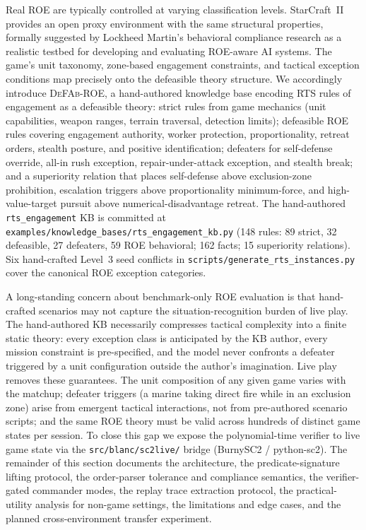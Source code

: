 \documentclass{article}
\theoremstyle{definition}
\begin{document}
Real ROE are typically controlled at varying classification levels. StarCraft~II provides an open proxy environment with the same structural properties, formally suggested by Lockheed Martin's behavioral compliance research as a realistic testbed for developing and evaluating ROE-aware AI systems. The game's unit taxonomy, zone-based engagement constraints, and tactical exception conditions map precisely onto the defeasible theory structure. We accordingly introduce \textsc{DeFAb-ROE}, a hand-authored knowledge base encoding RTS rules of engagement as a defeasible theory: strict rules from game mechanics (unit capabilities, weapon ranges, terrain traversal, detection limits); defeasible ROE rules covering engagement authority, worker protection, proportionality, retreat orders, stealth posture, and positive identification; defeaters for self-defense override, all-in rush exception, repair-under-attack exception, and stealth break; and a superiority relation that places self-defense above exclusion-zone prohibition, escalation triggers above proportionality minimum-force, and high-value-target pursuit above numerical-disadvantage retreat. The hand-authored \texttt{rts\_engagement} KB is committed at \texttt{examples/knowledge\_bases/rts\_engagement\_kb.py} (148 rules: 89 strict, 32 defeasible, 27 defeaters, 59 ROE behavioral; 162 facts; 15 superiority relations). Six hand-crafted Level~3 seed conflicts in \texttt{scripts/generate\_rts\_instances.py} cover the canonical ROE exception categories.

A long-standing concern about benchmark-only ROE evaluation is that hand-crafted scenarios may not capture the situation-recognition burden of live play. The hand-authored KB necessarily compresses tactical complexity into a finite static theory: every exception class is anticipated by the KB author, every mission constraint is pre-specified, and the model never confronts a defeater triggered by a unit configuration outside the author's imagination. Live play removes these guarantees. The unit composition of any given game varies with the matchup; defeater triggers (a marine taking direct fire while in an exclusion zone) arise from emergent tactical interactions, not from pre-authored scenario scripts; and the same ROE theory must be valid across hundreds of distinct game states per session. To close this gap we expose the polynomial-time verifier to live game state via the \texttt{src/blanc/sc2live/} bridge (BurnySC2 / python-sc2). The remainder of this section documents the architecture, the predicate-signature lifting protocol, the order-parser tolerance and compliance semantics, the verifier-gated commander modes, the replay trace extraction protocol, the practical-utility analysis for non-game settings, the limitations and edge cases, and the planned cross-environment transfer experiment.
\end{document}
